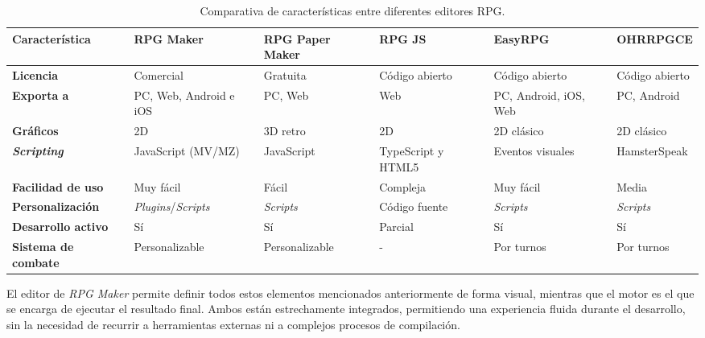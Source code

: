 \begin{table}[t]
	\centering
	\renewcommand\tabularxcolumn[1]{m{#1}}
	\scriptsize
	\begin{tabularx}{\textwidth}{@{} >{\raggedright\arraybackslash}X >{\centering\arraybackslash}X >{\centering\arraybackslash}X >{\centering\arraybackslash}X >{\centering\arraybackslash}X >{\centering\arraybackslash}X @{}}
		\toprule
		\textbf{Característica} & \textbf{RPG Maker} & \textbf{RPG Paper Maker} & \textbf{RPG JS} & \textbf{EasyRPG} & \textbf{OHRRPGCE} \\
		\midrule
		\textbf{Licencia} & Comercial & Gratuita & Código abierto & Código abierto & Código abierto \\
		\addlinespace[4pt]
		\textbf{Exporta a} & PC\footnotemark, Web, Android e iOS & PC, Web & Web & PC, Android, iOS, Web & PC, Android \\
		\addlinespace[4pt]
		\textbf{Gráficos} & 2D & 3D retro & 2D & 2D clásico & 2D clásico \\
		\addlinespace[4pt]
		\textbf{\textit{Scripting}} & JavaScript (MV/MZ) & JavaScript & TypeScript y HTML5  & Eventos visuales & HamsterSpeak \\
		\addlinespace[4pt]
		\textbf{Facilidad de uso} & Muy fácil & Fácil & Compleja & Muy fácil & Media \\
		\addlinespace[4pt]
		\textbf{Personalización}  & \textit{Plugins}/\textit{Scripts} & \textit{Scripts}  & Código fuente & \textit{Scripts} & \textit{Scripts} \\
		\addlinespace[4pt]
		\textbf{Desarrollo activo} & Sí & Sí & Parcial & Sí & Sí \\
		\addlinespace[4pt]
		\textbf{Sistema de combate} & Personalizable & Personalizable & - & Por turnos & Por turnos \\
		\bottomrule
	\end{tabularx}
	\caption{Comparativa de características entre diferentes editores RPG.}
	\label{tab:comparativarpg}
\end{table}


El editor de \textit{RPG Maker} permite definir todos estos elementos mencionados anteriormente de forma visual, mientras que el motor es el que se encarga de ejecutar el resultado final. Ambos están estrechamente integrados, permitiendo una experiencia fluida durante el desarrollo, sin la necesidad de recurrir a herramientas externas ni a complejos procesos de compilación.

